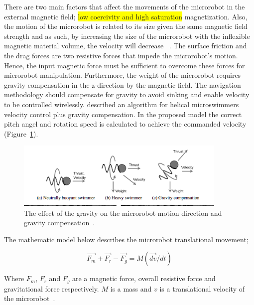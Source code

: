 \documentclass[12pt,a4paper,titlepage]{report}
\newcommand{\hilight}[1]{\colorbox{yellow}{#1}}
\begin{document}
There are two main factors that affect the movements of the microrobot in the external magnetic
 field; \hilight{low coercivity and high saturation} magnetization. Also, the motion of the microrobot is related to 
its size given the same magnetic field strength and as such, by increasing the size of the microrobot with the inflexible magnetic material
 volume, the velocity will decrease ~\citep{kim2013fabrication}. 
The surface friction and the drag forces are two resistive forces that impede the microrobot\rq{}s 
motion. Hence, the input magnetic force must be sufficient to overcome these forces for microrobot 
manipulation. Furthermore, the weight of the microrobot requires gravity compensation in the z-direction by 
the magnetic field. The navigation methodology should compensate for gravity to avoid sinking and enable velocity to be 
controlled wirelessly. \citeauthor{mahoney2011velocity} described an algorithm for helical microswimmers velocity 
control plus gravity compensation. In the proposed model the correct pitch angel and 
rotation speed is calculated to achieve the commanded velocity (Figure~\ref{11}).


\begin{figure}
  \centering
    \includegraphics[width=0.9\textwidth]{11}
  \caption{The effect of the gravity on the microrobot motion direction and gravity compensation~\citep{mahoney2011velocity}.}
  \label{11}
\end{figure}


The mathematic model below describes the microrobot translational movement;

\begin{equation}
  \overrightarrow{F_m }+ \overrightarrow{F_r} - \overrightarrow{F_g} = M(\overrightarrow{dv}/dt)
\label{eq:4}
\end{equation}

Where $F_m$, $F_r$ and $F_g$ are a magnetic force, overall resistive force and gravitational force respectively. 
$M$ is a mass and $v$ is a translational velocity of the microrobot~\citep{kim2013fabrication}. 
\end{document}
